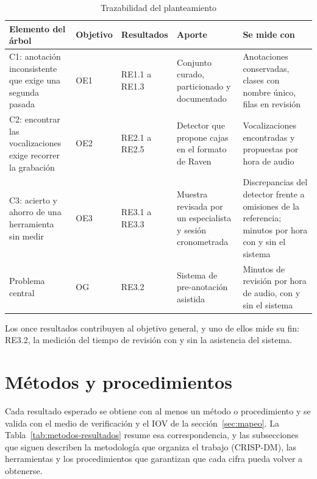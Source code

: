\begin{table}[!htbp]
    \centering
    \caption{Trazabilidad del planteamiento}
    \label{tab:trazabilidad}
    \small
    \begin{tabular}{@{}L{3.5cm}L{1.6cm}L{1.9cm}L{3.4cm}L{3.7cm}@{}}
        \toprule
        \textbf{Elemento del árbol} & \textbf{Objetivo} & \textbf{Resultados} & \textbf{Aporte} & \textbf{Se mide con} \\
        \midrule
        C1: anotación inconsistente que exige una segunda pasada & OE1 & RE1.1 a RE1.3 & Conjunto curado, particionado y documentado & Anotaciones conservadas, clases con nombre único, filas en revisión \\
        \addlinespace
        C2: encontrar las vocalizaciones exige recorrer la grabación & OE2 & RE2.1 a RE2.5 & Detector que propone cajas en el formato de Raven & Vocalizaciones encontradas y propuestas por hora de audio \\
        \addlinespace
        C3: acierto y ahorro de una herramienta sin medir & OE3 & RE3.1 a RE3.3 & Muestra revisada por un especialista y sesión cronometrada & Discrepancias del detector frente a omisiones de la referencia; minutos por hora con y sin el sistema \\
        \midrule
        Problema central & OG & RE3.2 & Sistema de pre-anotación asistida & Minutos de revisión por hora de audio, con y sin el sistema \\
        \bottomrule
    \end{tabular}
\end{table}

Los once resultados contribuyen al objetivo general, y uno de ellos mide su fin:
RE3.2, la medición del tiempo de revisión con y sin la asistencia del sistema.

\section{Métodos y procedimientos}
\label{sec:metodos}

Cada resultado esperado se obtiene con al menos un método o procedimiento y se
valida con el medio de verificación y el IOV de la sección~\ref{sec:mapeo}. La
Tabla~\ref{tab:metodos-resultados} resume esa correspondencia, y las subsecciones
que siguen describen la metodología que organiza el trabajo (CRISP-DM), las
herramientas y los procedimientos que garantizan que cada cifra pueda volver a
obtenerse.


